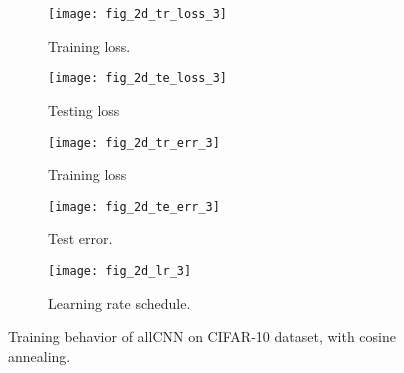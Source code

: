 \documentclass[12pt]{article}
\begin{document}
   \begin{figure}
     \centering
     \begin{subfigure}[b]{0.3\textwidth}
         \centering
         \texttt{[image: fig\_2d\_tr\_loss\_3]}
         \caption{Training loss. }
         \label{fig:y equals x}
     \end{subfigure}
     \hfill
     \begin{subfigure}[b]{0.3\textwidth}
         \centering
         \texttt{[image: fig\_2d\_te\_loss\_3]}
         \caption{Testing loss}
         \label{fig:three sin x}
     \end{subfigure}
     \hfill
     \begin{subfigure}[b]{0.3\textwidth}
         \centering
         \texttt{[image: fig\_2d\_tr\_err\_3]}
         \caption{Training loss}
         \label{fig:five over x}
     \end{subfigure}
      \begin{subfigure}[b]{0.3\textwidth}
         \centering
         \texttt{[image: fig\_2d\_te\_err\_3]}
         \caption{Test error. }
         \label{fig:y equals x}
     \end{subfigure}
     \hfill
     \begin{subfigure}[b]{0.3\textwidth}
         \centering
         \texttt{[image: fig\_2d\_lr\_3]}
         \caption{Learning rate schedule. }
         \label{fig:y equals x}
     \end{subfigure}
     \hfil
        \caption{Training behavior of allCNN on CIFAR-10 dataset, with cosine annealing. }
        \label{fig:three graphs}
\end{figure}
 
 
\end{document}

